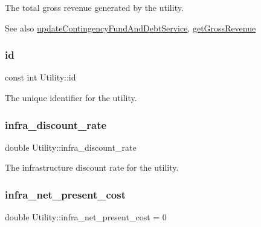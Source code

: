 The total gross revenue generated by the utility. 

\begin{DoxySeeAlso}{See also}
\mbox{\hyperlink{classUtility_ab663efd526505a3d843cae7075cc3b91}{update\+Contingency\+Fund\+And\+Debt\+Service}}, \mbox{\hyperlink{classUtility_a2903344b317f0949014c687d285b64b6}{get\+Gross\+Revenue}} 
\end{DoxySeeAlso}
\mbox{\label{classUtility_ad41c4ea5c911c5000452a3371cd65d5f}} 
\subsubsection{\texorpdfstring{id}{id}}
{\footnotesize\ttfamily const int Utility\+::id}



The unique identifier for the utility. 

\mbox{\label{classUtility_a30d506af7125857c7b386f65b10c6d48}} 
\subsubsection{\texorpdfstring{infra\+\_\+discount\+\_\+rate}{infra\_discount\_rate}}
{\footnotesize\ttfamily double Utility\+::infra\+\_\+discount\+\_\+rate\hspace{0.3cm}{\ttfamily [private]}}



The infrastructure discount rate for the utility. 

\mbox{\label{classUtility_a59d009825a96c734953f27edfa9e587e}} 
\subsubsection{\texorpdfstring{infra\+\_\+net\+\_\+present\+\_\+cost}{infra\_net\_present\_cost}}
{\footnotesize\ttfamily double Utility\+::infra\+\_\+net\+\_\+present\+\_\+cost = 0\hspace{0.3cm}{\ttfamily [private]}}




